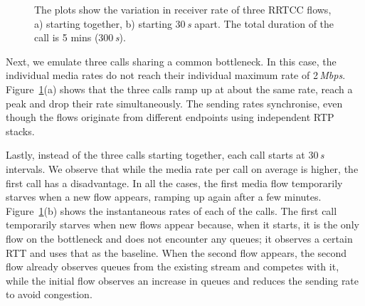 \begin{figure}[!t]
\centerline{
  }
  \centerline{
  }
   \caption{The plots show the variation in receiver rate of three RRTCC
   flows, a) starting together, b) starting 30\,\emph{s} apart. The total duration of
   the call is 5 mins (300\,\emph{s}).}
\label{fig:rrtcc-self-fair}
\end{figure}

\begin{table}[!t]
\begin{center}
\end{center}
    \caption{RRTCC competing with similar cross-traffic on the bottleneck link.}
    \label{tab:self-fair}
\end{table}

Next, we emulate three calls sharing a common bottleneck. In this case, the
individual media rates do not reach their individual maximum rate of 2\,\emph{Mbps}.
Figure~\ref{fig:rrtcc-self-fair}(a) shows that the three calls ramp up at about the
same rate, reach a peak and drop their rate simultaneously. The sending rates
synchronise, even though the flows originate from different endpoints using
independent RTP stacks.

Lastly, instead of the three calls starting together, each call starts at 30\,\emph{s}
intervals. We observe that while the media rate per call on average is higher,
the first call has a disadvantage. In all the cases, the first media flow temporarily 
starves when a new flow appears, ramping up again after a few minutes.
Figure~\ref{fig:rrtcc-self-fair}(b) shows the instantaneous rates of each of
the calls. The first call temporarily starves when new flows appear because,
when it starts, it is the only flow on the bottleneck and does not encounter
any queues; it observes a certain RTT and uses that as the baseline. When the
second flow appears, the second flow already observes queues from the existing
stream and competes with it, while the initial flow observes an increase in
queues and reduces the sending rate to avoid congestion.


